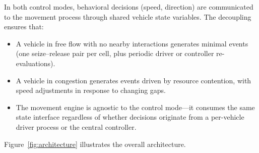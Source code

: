 \documentclass[review,authoryear]{elsarticle}
\begin{document}
In both control modes, behavioral decisions (speed, direction) are communicated to the movement process through shared vehicle state variables. The decoupling ensures that:

\begin{itemize}
    \item A vehicle in free flow with no nearby interactions generates minimal events (one seize--release pair per cell, plus periodic driver or controller re-evaluations).
    \item A vehicle in congestion generates events driven by resource contention, with speed adjustments in response to changing gaps.
    \item The movement engine is agnostic to the control mode---it consumes the same state interface regardless of whether decisions originate from a per-vehicle driver process or the central controller.
\end{itemize}

Figure~\ref{fig:architecture} illustrates the overall architecture.
\end{document}
